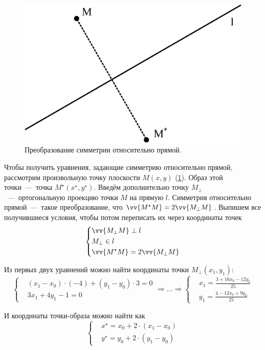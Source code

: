 \documentclass[a4paper,12pt]{article}
\begin{document}
  \begin{solution}
    \begin{figure}
      \centering
      
      \includegraphics[width=0.5\columnwidth]{simmetria-linea}
      
      \caption{Преобразование симметрии относительно прямой.}
      \label{fig:simmetria-linea}
    \end{figure}
    
    Чтобы получить уравнения, задающие симметрию относительно прямой, рассмотрим произвольную точку плоскости $M(x, y)$ (\ref{fig:simmetria-linea}).
    Образ этой точки~---~точка $M^\star(x^\star, y^\star)$.
    Введём дополнительно точку $M_\perp$~---~ортогональную проекцию точки $M$ на прямую $l$.
    Симметрия относительно прямой~---~такое преобразование, что $\vv{M^\star M} \hm= 2 \vv{M_\perp M}$.
    Выпишем все получившиеся условия, чтобы потом переписать их через координаты точек
    \[
      \left\{
        \begin{aligned}
          &\vv{M_\perp M} \perp l\\
          &M_\perp \in l\\
          &\vv{M^\star M} = 2 \vv{M_\perp M}
        \end{aligned}
      \right.
    \]
    
    Из первых двух уравнений можно найти координаты точки $M_\perp(x_1, y_1)$:
    \[
      \left\{
        \begin{aligned}
          &(x_1 - x_0) \cdot (-4) + (y_1 - y_0) \cdot 3 = 0\\
          &3x_1 + 4y_1 - 1 = 0
        \end{aligned}
      \right.
      \Rightarrow \ldots
      \Rightarrow \left\{
        \begin{aligned}
          &x_1 = \frac{3 + 16x_0 - 12y_0}{25}\\
          &y_1 = \frac{4 - 12x_0 + 9y_0}{25}
        \end{aligned}
      \right.
    \]
    
    И координаты точки-образа можно найти как
    \[
      \left\{
        \begin{aligned}
          &x^\star = x_0 + 2 \cdot (x_1 - x_0)\\
          &y^\star = y_0 + 2 \cdot (y_1 - y_0)
        \end{aligned}
      \right.
    \]
    

\end{solution}
\end{document}
